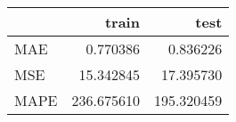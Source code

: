 \begin{tabular}{lrr}
\toprule
{} &       train &        test \\
\midrule
MAE  &    0.770386 &    0.836226 \\
MSE  &   15.342845 &   17.395730 \\
MAPE &  236.675610 &  195.320459 \\
\bottomrule
\end{tabular}
